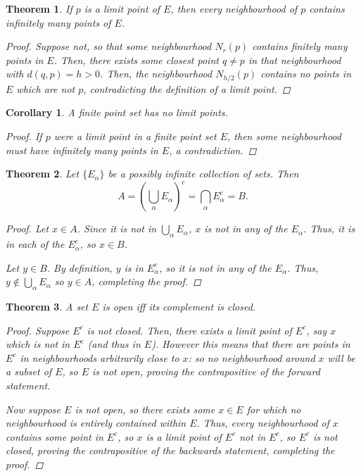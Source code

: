\documentclass{scrbook}
\newtheorem{theorem}{Theorem}
\newtheorem{corollary}{Corollary}
\begin{document}
\begin{theorem}
If $p$ is a limit point of $E$, then every neighbourhood of $p$ contains infinitely many points of $E$. 

\begin{proof}
Suppose not, so that some neighbourhood $N_r(p)$ contains finitely many points in $E$. Then, there exists some closest point $q \ne p$ in that neighbourhood with $d(q, p) = h > 0$. Then, the neighbourhood $N_{h/2}(p)$ contains no points in $E$ which are not $p$, contradicting the definition of a limit point.
\end{proof}
\end{theorem}

\begin{corollary}
A finite point set has no limit points.

\begin{proof}
If $p$ were a limit point in a finite point set $E$, then some neighbourhood must have infinitely many points in $E$, a contradiction.
\end{proof}
\end{corollary}

\begin{theorem}
Let $\{E_{\alpha}\}$ be a possibly infinite collection of sets. Then
\[
	A = \left( \bigcup_{\alpha} E_\alpha \right)^c = \bigcap_{\alpha} E_\alpha^c = B.
\]

\begin{proof}
Let $x \in A$. Since it is not in $\bigcup_\alpha E_\alpha$, $x$ is not in any of the $E_\alpha$. Thus, it is in each of the $E_\alpha^c$, so $x \in B$.

Let $y \in B$. By definition, $y$ is in $E_\alpha^c$, so it is not in any of the $E_\alpha$. Thus, $y \not\in \bigcup_\alpha E_\alpha$ so $y \in A$, completing the proof.
\end{proof}
\end{theorem}

\begin{theorem}
A set $E$ is open iff its complement is closed.

\begin{proof}
Suppose $E^c$ is not closed. Then, there exists a limit point of $E^c$, say $x$ which is not in $E^c$ (and thus in $E$). However this means that there are points in $E^c$ in neighbourhoods arbitrarily close to $x$: so no neighbourhood around $x$ will be a subset of $E$, so $E$ is not open, proving the contrapositive of the forward statement.

Now suppose $E$ is not open, so there exists some $x \in E$ for which no neighbourhood is entirely contained within $E$. Thus, every neighbourhood of $x$ contains some point in $E^c$, so $x$ is a limit point of $E^c$ not in $E^c$, so $E^c$ is not closed, proving the contrapositive of the backwards statement, completing the proof.
\end{proof}
\end{theorem}
\end{document}
